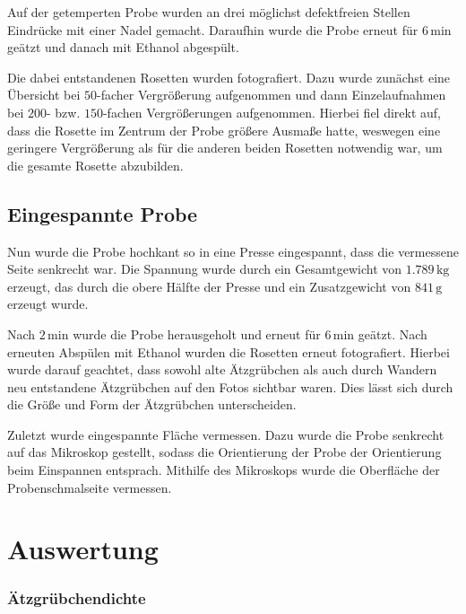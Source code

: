 \documentclass[12pt,a4paper]{scrartcl}
\numberwithin{equation}{section} %
\renewcommand{\[}{} %
\renewcommand{\]}{\noindent} %
\begin{document}
Auf der getemperten Probe wurden an drei möglichst defektfreien Stellen
Eindrücke mit einer Nadel gemacht. Daraufhin wurde die Probe erneut für
\(6\mathrm{\,min}\) geätzt und danach mit Ethanol abgespült.

Die dabei entstandenen Rosetten wurden fotografiert. Dazu wurde zunächst
eine Übersicht bei \(50\)-facher Vergrößerung aufgenommen und dann
Einzelaufnahmen bei \(200\)- bzw. \(150\)-fachen Vergrößerungen
aufgenommen. Hierbei fiel direkt auf, dass die Rosette im Zentrum der
Probe größere Ausmaße hatte, weswegen eine geringere Vergrößerung als
für die anderen beiden Rosetten notwendig war, um die gesamte Rosette
abzubilden.

\hypertarget{eingespannte-probe}{%
\subsection{Eingespannte Probe}\label{eingespannte-probe}}

Nun wurde die Probe hochkant so in eine Presse eingespannt, dass die
vermessene Seite senkrecht war. Die Spannung wurde durch ein
Gesamtgewicht von \(1.789\mathrm{\,kg}\) erzeugt, das durch die obere
Hälfte der Presse und ein Zusatzgewicht von \(841\mathrm{\,g}\) erzeugt
wurde.

Nach \(2\mathrm{\,min}\) wurde die Probe herausgeholt und erneut für
\(6\mathrm{\,min}\) geätzt. Nach erneuten Abspülen mit Ethanol wurden
die Rosetten erneut fotografiert. Hierbei wurde darauf geachtet, dass
sowohl alte Ätzgrübchen als auch durch Wandern neu entstandene
Ätzgrübchen auf den Fotos sichtbar waren. Dies lässt sich durch die
Größe und Form der Ätzgrübchen unterscheiden.

Zuletzt wurde eingespannte Fläche vermessen. Dazu wurde die Probe
senkrecht auf das Mikroskop gestellt, sodass die Orientierung der Probe
der Orientierung beim Einspannen entsprach. Mithilfe des Mikroskops
wurde die Oberfläche der Probenschmalseite vermessen.

\hypertarget{auswertung}{%
\section{Auswertung}\label{auswertung}}

\hypertarget{uxe4tzgruxfcbchendichte}{%
\subsubsection{Ätzgrübchendichte}\label{uxe4tzgruxfcbchendichte}}
\end{document}
